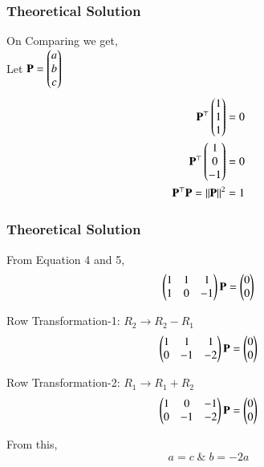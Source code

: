 \documentclass{beamer}
\begin{document}
\begin{frame}[fragile]
    \frametitle{Theoretical Solution}
On Comparing we get,\\
Let $\mathbf{P} = \begin{pmatrix}a \\ b \\c\end{pmatrix}$
\begin{align}
\mathbf{P}^\top\begin{pmatrix}1 \\ 1 \\ 1\end{pmatrix} &= 0\\
\mathbf{P}^\top\begin{pmatrix}1 \\ 0 \\ -1\end{pmatrix} &= 0\\
\mathbf{P}^\top\mathbf{P} = \left\lVert\mathbf{P}\right\rVert^2 &=  1
\end{align}
\end{frame}

\begin{frame}[fragile]
    \frametitle{Theoretical Solution}
From Equation 4 and 5,
\begin{equation}
    \begin{pmatrix}1 & 1 & 1 \\ 1 & 0 & -1\end{pmatrix}\mathbf{P} = \begin{pmatrix}0 \\ 0\end{pmatrix}
\end{equation}

Row Transformation-1: $R_2 \rightarrow R_2 - R_1$
\begin{equation}
    \begin{pmatrix}1 & 1 & 1 \\ 0 & -1 & -2\end{pmatrix}\mathbf{P} = \begin{pmatrix}0 \\ 0\end{pmatrix}
\end{equation}

Row Transformation-2: $R_1 \rightarrow R_1 + R_2$
\begin{equation}
    \begin{pmatrix}1 & 0 & -1 \\ 0 & -1 & -2\end{pmatrix}\mathbf{P} = \begin{pmatrix}0 \\ 0\end{pmatrix}
\end{equation}

From this,
\begin{equation}
    a = c \; \& \; b = -2a
\end{equation}
\end{frame}
\end{document}
